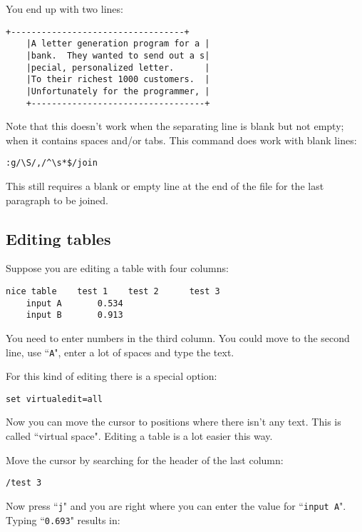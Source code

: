 You end up with two lines:

\begin{Verbatim}[samepage=true]
    +----------------------------------+
    |A letter generation program for a |
    |bank.  They wanted to send out a s|
    |pecial, personalized letter.      |
    |To their richest 1000 customers.  |
    |Unfortunately for the programmer, |
    +----------------------------------+
\end{Verbatim}

Note that this doesn't work when the separating line is blank but not empty; when it contains spaces and/or tabs.
This command does work with blank lines:

\begin{Verbatim}[samepage=true]
 :g/\S/,/^\s*$/join
\end{Verbatim}

This still requires a blank or empty line at the end of the file for the last paragraph to be joined.
\subsection{Editing tables}
Suppose you are editing a table with four columns:

\begin{Verbatim}[samepage=true]
    nice table    test 1    test 2      test 3 
    input A       0.534 
    input B       0.913 
\end{Verbatim}

You need to enter numbers in the third column.
You could move to the second line, use ``\texttt{A}", enter a lot of spaces and type the text.

For this kind of editing there is a special option:

\begin{Verbatim}[samepage=true]
 set virtualedit=all
\end{Verbatim}

Now you can move the cursor to positions where there isn't any text.
This is called ``virtual space".
Editing a table is a lot easier this way.

Move the cursor by searching for the header of the last column:

\begin{Verbatim}[samepage=true]
 /test 3
\end{Verbatim}

Now press ``\texttt{j}" and you are right where you can enter the value for ``\texttt{input A}".
Typing ``\texttt{0.693}" results in:

